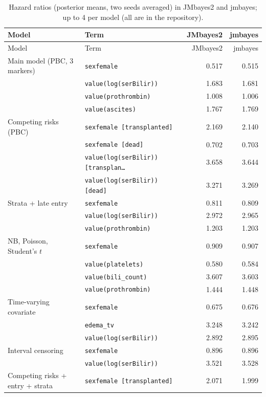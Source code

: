 \begingroup\small\setlength{\tabcolsep}{4pt}
\begin{longtable}{llrr}
\caption{Hazard ratios (posterior means, two seeds averaged) in JMbayes2 and jmbayes; up to 4 per model (all are in the repository).}\label{tab:hrall}\\
\toprule Model & Term & JMbayes2 & jmbayes \\ \midrule \endfirsthead
\toprule Model & Term & JMbayes2 & jmbayes \\ \midrule \endhead
\bottomrule \endlastfoot
Main model (PBC, 3 markers) & \texttt{sexfemale} & 0.517 & 0.515 \\
 & \texttt{value(log(serBilir))} & 1.683 & 1.681 \\
 & \texttt{value(prothrombin)} & 1.008 & 1.006 \\
 & \texttt{value(ascites)} & 1.767 & 1.769 \\
\addlinespace
Competing risks (PBC) & \texttt{sexfemale [transplanted]} & 2.169 & 2.140 \\
 & \texttt{sexfemale [dead]} & 0.702 & 0.703 \\
 & \texttt{value(log(serBilir)) [transplan\ldots} & 3.658 & 3.644 \\
 & \texttt{value(log(serBilir)) [dead]} & 3.271 & 3.269 \\
\addlinespace
Strata + late entry & \texttt{sexfemale} & 0.811 & 0.809 \\
 & \texttt{value(log(serBilir))} & 2.972 & 2.965 \\
 & \texttt{value(prothrombin)} & 1.203 & 1.203 \\
\addlinespace
NB, Poisson, Student's $t$ & \texttt{sexfemale} & 0.909 & 0.907 \\
 & \texttt{value(platelets)} & 0.580 & 0.584 \\
 & \texttt{value(bili\_count)} & 3.607 & 3.603 \\
 & \texttt{value(prothrombin)} & 1.444 & 1.448 \\
\addlinespace
Time-varying covariate & \texttt{sexfemale} & 0.675 & 0.676 \\
 & \texttt{edema\_tv} & 3.248 & 3.242 \\
 & \texttt{value(log(serBilir))} & 2.892 & 2.895 \\
\addlinespace
Interval censoring & \texttt{sexfemale} & 0.896 & 0.896 \\
 & \texttt{value(log(serBilir))} & 3.521 & 3.528 \\
\addlinespace
Competing risks + entry + strata & \texttt{sexfemale [transplanted]} & 2.071 & 1.999 \\

\end{longtable}
